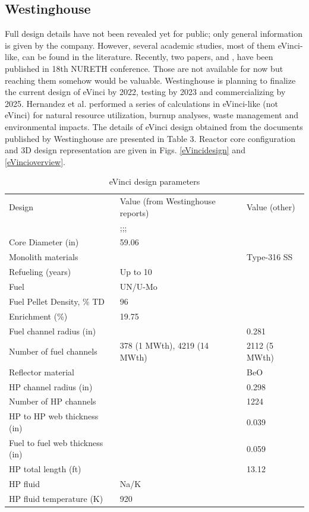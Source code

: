 \documentclass[10pt,a4paper]{article}
\begin{document}
\pagebreak
\subsection{Westinghouse}
Full design details have not been revealed yet for public; only general information is given by the company. However, several academic studies, most of them eVinci-like, can be found in the literature. Recently, two papers, \cite{Xu19} and \cite{Wright19}, have been published in 18th NURETH conference. Those are not available for now but reaching them somehow would be valuable. Westinghouse is planning to finalize the current design of eVinci by 2022, testing by 2023 and commercializing by 2025. Hernandez et al. \cite{Hernandez19} performed a series of calculations in eVinci-like (not eVinci) for natural resource utilization, burnup analyses, waste management and environmental impacts. The details of eVinci design obtained from the documents published by Westinghouse are presented in Table 3. Reactor core configuration and 3D design representation are given in Figs. \ref{eVincidesign} and \ref{eVincioverview}.

\begin{table} [ht]
\begin{center}

\caption{eVinci design parameters}
\begin{tabular}{l  l  l}
\hline
Design 		&Value (from Westinghouse reports) 		& Value (other) \cite{Hernandez19}\\ 
	& 	\cite{IAEA18};\cite{Levinsky18};\cite{Yan20};\cite{Arafat19} 	&  \\ 
\hline
Core Diameter (in) 		&59.06 		&  \\ 
Monolith materials 		& 		& Type-316 SS	\\ 
Refueling (years) 		&Up to 10 		&  \\ 
Fuel 		&UN/U-Mo 		& 	 \\ 
Fuel Pellet Density, \% TD 		&96 		&  \\ 
Enrichment (\%) 		&19.75 		&  \\ 
Fuel channel radius (in) 		& 		& 0.281 \\ 
Number of fuel channels 		&378 (1 MWth), 4219 (14 MWth)		& 2112 (5 MWth) \\ 
Reflector material 		&		& BeO\\ 
HP channel radius (in) 		&		& 0.298\\ 
Number of HP channels 		& 		& 1224\\ 
HP to HP web thickness (in) 		& 		& 0.039\\ 
Fuel to fuel web thickness (in) 		& 		& 0.059\\ 
HP total length (ft) 		&		& 13.12\\ 
HP fluid 		&Na/K		& \\ 
HP fluid temperature (K) 		&920 		& \\ 
\hline

\end{tabular}
\end{center}
\end{table}
\end{document}
